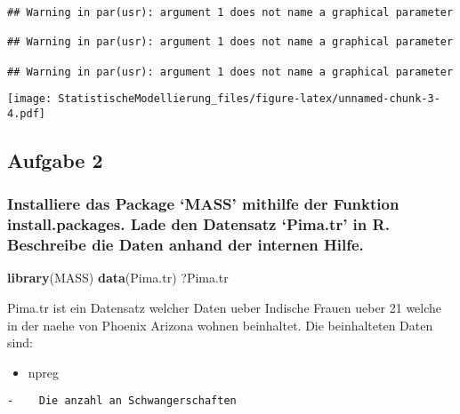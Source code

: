 \documentclass[
]{article}
\newenvironment{Shaded}{\begin{snugshade}}{\end{snugshade}}
\newcommand{\FunctionTok}[1]{\textcolor[rgb]{0.13,0.29,0.53}{\textbf{#1}}}
\newcommand{\NormalTok}[1]{#1}
\providecommand{\tightlist}{%
  \setlength{\itemsep}{0pt}\setlength{\parskip}{0pt}}
\begin{document}
\begin{verbatim}
## Warning in par(usr): argument 1 does not name a graphical parameter

## Warning in par(usr): argument 1 does not name a graphical parameter

## Warning in par(usr): argument 1 does not name a graphical parameter
\end{verbatim}

\texttt{[image: StatistischeModellierung\_files/figure-latex/unnamed-chunk-3-4.pdf]}

\subsection{Aufgabe 2}\label{aufgabe-2}

\subsubsection{Installiere das Package `MASS' mithilfe der Funktion
install.packages. Lade den Datensatz `Pima.tr' in R. Beschreibe die
Daten anhand der internen
Hilfe.}\label{installiere-das-package-mass-mithilfe-der-funktion-install.packages.-lade-den-datensatz-pima.tr-in-r.-beschreibe-die-daten-anhand-der-internen-hilfe.}

\begin{Shaded}
\begin{Highlighting}[]
\FunctionTok{library}\NormalTok{(MASS)}
\FunctionTok{data}\NormalTok{(Pima.tr)}
\NormalTok{?Pima.tr}
\end{Highlighting}
\end{Shaded}

Pima.tr ist ein Datensatz welcher Daten ueber Indische Frauen ueber 21
welche in der naehe von Phoenix Arizona wohnen beinhaltet. Die
beinhalteten Daten sind:

\begin{itemize}
\tightlist
\item
  npreg
\end{itemize}

\begin{verbatim}
-    Die anzahl an Schwangerschaften
\end{verbatim}
\end{document}
